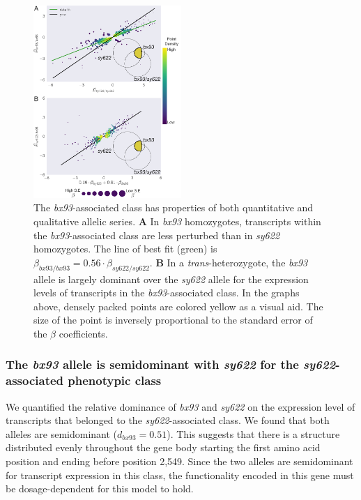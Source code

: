 \documentclass[10pt, twocolumn]{article}
\begin{document}
\begin{figure}
  \centering{}
  \includegraphics[width=0.5\textwidth]{../figs/bx93_associated_analysis.pdf}
  \caption{The \emph{bx93}-associated class has properties of both quantitative
    and qualitative allelic series.
    \textbf{A} In \emph{bx93}
    homozygotes, transcripts within the \emph{bx93}-associated class are
    less perturbed than in \emph{sy622}
    homozygotes. The line of best fit (green) is
    $\beta_{bx93/bx93}=0.56\cdot\beta_{sy622/sy622}$.
    \textbf{B} In a \emph{trans}-heterozygote, the \emph{bx93} allele is largely
    dominant over the \emph{sy622} allele for the expression levels of
    transcripts in the \emph{bx93}-associated class.
    In the graphs above, densely packed points are colored yellow as a visual
    aid. The size of the point is inversely proportional to the standard error
    of the $\beta$ coefficients.
    }
\label{fig:bx93_associated}
\end{figure}

\subsubsection*{The \emph{bx93} allele is semidominant with \emph{sy622} for the
                \emph{sy622}-associated phenotypic class}
We quantified the relative dominance of \emph{bx93} and \emph{sy622} on the
expression level of transcripts that belonged to the \emph{sy622}-associated
class. We found that both alleles are semidominant ($d_{bx93} = 0.51$). This
suggests that there is a structure distributed evenly throughout the gene
body starting the first amino acid position and ending before position 2,549.
Since the two alleles are semidominant for transcript expression in this class,
the functionality encoded in this gene must be dosage-dependent for this model
to hold.
\end{document}
